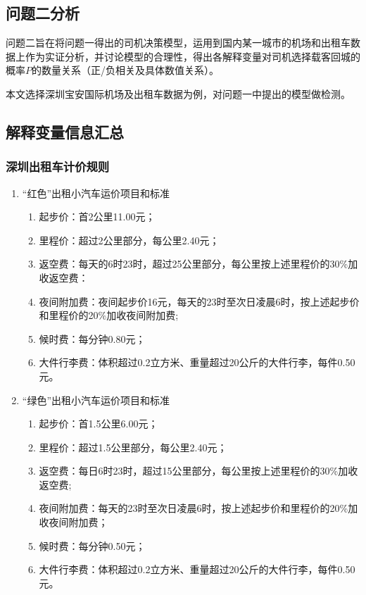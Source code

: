 \subsection{问题二分析}
问题二旨在将问题一得出的司机决策模型，运用到国内某一城市的机场和出租车数据上作为实证分析，并讨论模型的合理性，得出各解释变量对司机选择载客回城的概率$P$的数量关系（正/负相关及具体数值关系）。

本文选择深圳宝安国际机场及出租车数据为例，对问题一中提出的模型做检测。


\subsection{解释变量信息汇总}
\subsubsection{深圳出租车计价规则}
\begin{enumerate}[label=\chinese*、]
    \item ``红色''出租小汽车运价项目和标准
        \begin{enumerate}[label=（\chinese*）]
            \item 起步价：首2公里11.00元；
            \item 里程价：超过2公里部分，每公里2.40元；
            \item 返空费：每天的6时23时，超过25公里部分，每公里按上述里程价的30\%加收返空费：
            \item 夜间附加费：夜间起步价16元，每天的23时至次日凌晨6时，按上述起步价和里程价的20\%加收夜间附加费;
            \item 候时费：每分钟0.80元；
            \item 大件行李费：体积超过0.2立方米、重量超过20公斤的大件行李，每件0.50元。
        \end{enumerate}

    \item ``绿色''出租小汽车运价项目和标准
        \begin{enumerate}[label=（\chinese*）]
            \item 起步价：首1.5公里6.00元；
            \item 里程价：超过1.5公里部分，每公里2.40元；
            \item 返空费：每日6时23时，超过15公里部分，每公里按上述里程价的30\%加收返空费;
            \item 夜间附加费：每天的23时至次日凌晨6时，按上述起步价和里程价的20\%加收夜间附加费；
            \item 候时费：每分钟0.50元；
            \item 大件行李费：体积超过0.2立方米、重量超过20公斤的大件行李，每件0.50元。
        \end{enumerate}
\end{enumerate}

